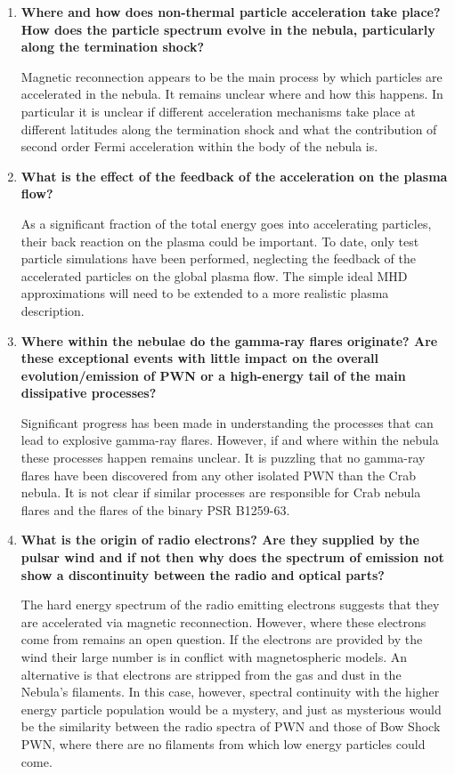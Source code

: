 \begin{enumerate}

\item \textbf{Where and how does non-thermal particle acceleration take place? How does the particle spectrum evolve in the nebula, particularly along the termination shock? }

Magnetic reconnection appears to be the main process by which particles are accelerated in the nebula. It remains unclear where and how this happens. In particular it is unclear if different acceleration mechanisms take place at different latitudes along the termination shock and what the contribution of second order Fermi acceleration within the body of the nebula is.

\item \textbf{What is the effect of the feedback of the acceleration on the plasma flow?}

As a significant fraction of the total energy goes into accelerating particles, their back reaction on the plasma could be important. To date, only test particle simulations have been performed, neglecting the feedback of the accelerated particles on the global plasma flow. The simple ideal MHD approximations will need to be extended to a more realistic plasma description.

\item \textbf{Where within the nebulae do the gamma-ray flares originate? Are these exceptional events with little impact on the overall evolution/emission of PWN or a high-energy tail of the main dissipative processes?  }

Significant progress has been made in understanding the processes that can lead to explosive gamma-ray flares. However, if and where within the nebula these processes happen remains unclear. It is puzzling that no gamma-ray flares have been discovered from any other isolated PWN than the Crab nebula. It is not clear if similar processes are responsible for Crab nebula flares and the flares of the binary PSR B1259-63.

\item \textbf{What is the origin of radio electrons? Are they supplied by the pulsar wind and if not then why does the spectrum of emission not show a discontinuity between the radio and optical parts? }

The hard energy spectrum of the radio emitting electrons suggests that they are accelerated via magnetic reconnection. However, where these electrons come from remains an open question. If the electrons are provided by the wind their large number is in conflict with magnetospheric models. An alternative is that electrons are stripped from the gas and dust in the Nebula's filaments. In this case, however, spectral continuity with the higher energy particle population would be a mystery, and just as mysterious would be the similarity between the radio spectra of PWN and those of Bow Shock PWN, where there are no filaments from which low energy particles could come.


\end{enumerate}
